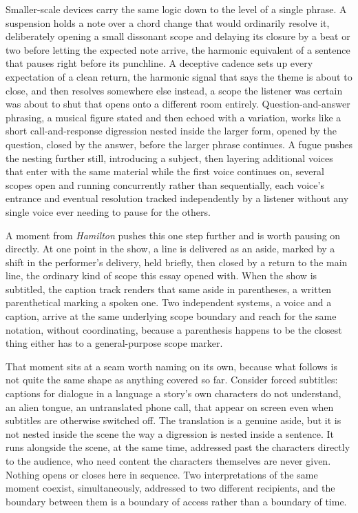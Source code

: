 \documentclass[11pt]{article}
\begin{document}
Smaller-scale devices carry the same logic down to the level of a single phrase. A suspension holds a note over a chord change that would ordinarily resolve it, deliberately opening a small dissonant scope and delaying its closure by a beat or two before letting the expected note arrive, the harmonic equivalent of a sentence that pauses right before its punchline. A deceptive cadence sets up every expectation of a clean return, the harmonic signal that says the theme is about to close, and then resolves somewhere else instead, a scope the listener was certain was about to shut that opens onto a different room entirely. Question-and-answer phrasing, a musical figure stated and then echoed with a variation, works like a short call-and-response digression nested inside the larger form, opened by the question, closed by the answer, before the larger phrase continues. A fugue pushes the nesting further still, introducing a subject, then layering additional voices that enter with the same material while the first voice continues on, several scopes open and running concurrently rather than sequentially, each voice's entrance and eventual resolution tracked independently by a listener without any single voice ever needing to pause for the others.

A moment from \emph{Hamilton} pushes this one step further and is worth pausing on directly. At one point in the show, a line is delivered as an aside, marked by a shift in the performer's delivery, held briefly, then closed by a return to the main line, the ordinary kind of scope this essay opened with. When the show is subtitled, the caption track renders that same aside in parentheses, a written parenthetical marking a spoken one. Two independent systems, a voice and a caption, arrive at the same underlying scope boundary and reach for the same notation, without coordinating, because a parenthesis happens to be the closest thing either has to a general-purpose scope marker.

That moment sits at a seam worth naming on its own, because what follows is not quite the same shape as anything covered so far. Consider forced subtitles: captions for dialogue in a language a story's own characters do not understand, an alien tongue, an untranslated phone call, that appear on screen even when subtitles are otherwise switched off. The translation is a genuine aside, but it is not nested inside the scene the way a digression is nested inside a sentence. It runs alongside the scene, at the same time, addressed past the characters directly to the audience, who need content the characters themselves are never given. Nothing opens or closes here in sequence. Two interpretations of the same moment coexist, simultaneously, addressed to two different recipients, and the boundary between them is a boundary of access rather than a boundary of time.
\end{document}
